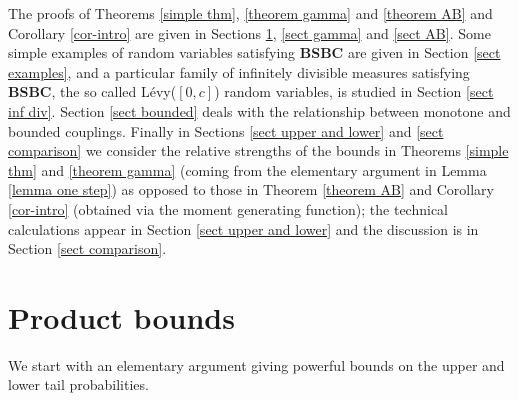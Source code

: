 \documentclass[smallextended,envcountsect]{svjour3}
\begin{document}
The proofs of Theorems \ref{simple thm}, \ref{theorem gamma} and \ref{theorem AB} and Corollary \ref{cor-intro} are given in Sections \ref{sect product}, \ref{sect gamma} and \ref{sect AB}.  Some simple examples of random variables satisfying {\bf BSBC} are given in Section \ref{sect examples}, and a particular family of infinitely divisible measures satisfying {\bf BSBC}, the so called L\'evy($[0,c]$) random variables, is studied in Section \ref{sect inf div}.  Section \ref{sect bounded} deals with the relationship between monotone and bounded couplings.  Finally in Sections \ref{sect upper and lower} and \ref{sect comparison} we consider the relative strengths of the bounds in Theorems \ref{simple thm} and \ref{theorem gamma} (coming from the elementary argument in Lemma \ref{lemma one step}) as opposed to those in Theorem \ref{theorem AB} and Corollary \ref{cor-intro} (obtained via the moment generating function); the technical calculations appear in Section \ref{sect upper and lower} and the discussion is in Section \ref{sect comparison}. 

 \section{Product bounds} \label{sect product}

We start with an elementary argument giving powerful bounds on the upper and lower tail probabilities.
\end{document}
